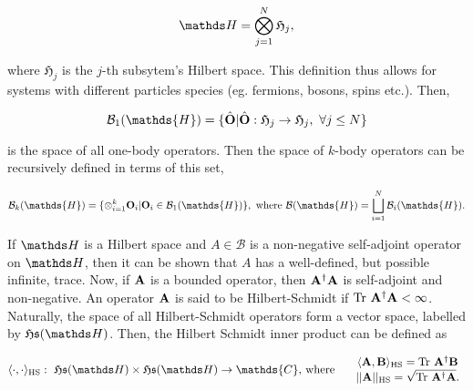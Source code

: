 \documentclass{homework}
\begin{document}
$$
    \hilbert = \bigotimes_{j=1}^{N} \mathfrak{H}_j,
$$ 

where $\mathfrak{H}_j$ is the $j$-th subsytem's Hilbert space. This definition thus allows for systems with different particles species (eg. fermions, bosons, spins etc.). Then, 

$$
\mathcal{B}_1(\mathds{H})=\{\hat{\bf O}| \hat{\bf O}:\mathfrak{H}_j \rightarrow \mathfrak{H}_j, \blanky \forall j \leq N \}
$$ 

is the space of all one-body operators. Then the
space of $k$-body operators can be recursively defined in terms of this set, 

\begin{align*}
\mathcal{B}_k(\mathds{H}) = \{\otimes_{i=1}^{k} {\bf O}_i | {\bf O}_i \in \mathcal{B}_1(\mathds{H}) \}, \textnormal{ where } \mathcal{B}(\mathds{H}) = \bigsqcup_{i=1}^{N} \mathcal{B}_i(\mathds{H}).
\end{align*}


If $\hilbert$ is a Hilbert space and $A \in \mathcal{B}$ is a non-negative self-adjoint operator on $\hilbert$, then it can be shown that $A$ has a well-defined, but possible infinite, trace. Now, if ${\bf A}$ is a bounded operator, then ${\bf A}^\dagger {\bf A}$ is self-adjoint and non-negative. An operator ${\bf A}$ is said to be Hilbert-Schmidt if $\textnormal{Tr } \bf A^\dagger {\bf A} < \infty$. Naturally, the space of all Hilbert-Schmidt operators form a vector space, labelled by $\mathfrak{H}\mathfrak{s}(\hilbert)$. Then, the Hilbert Schmidt inner product can be defined as 

\begin{align*}
\langle \cdot , \cdot \rangle_{\textnormal{HS}}: \blanky \mathfrak{H}\mathfrak{s}(\hilbert) \times \mathfrak{H}\mathfrak{s}(\hilbert) \rightarrow \mathds{C}, & \textnormal{ where } &
    \begin{array}{c} 
         \langle {\bf A}, {\bf B} \rangle_{\textnormal{HS}} = \textnormal{Tr } \bf A^\dagger {\bf B} \\
         ||{\bf A}||_{\textnormal{HS}} = \sqrt{\textnormal{Tr } \bf A^\dagger {\bf A}}.
    \end{array}
\end{align*}
\end{document}
